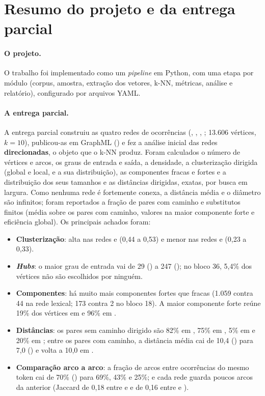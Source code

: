 \section{Resumo do projeto e da entrega parcial}\label{sec:parcial}

\paragraph{O projeto.} O trabalho foi implementado como um \emph{pipeline} em Python, com uma
etapa por módulo (corpus, amostra, extração dos vetores, k-NN, métricas, análise e relatório),
configurado por arquivos YAML.

\paragraph{A entrega parcial.} A entrega parcial construiu as quatro redes de ocorrências
(, , , ; 13.606 vértices, $k=10$), publicou-as em GraphML
() e fez a análise inicial das redes \textbf{direcionadas}, o objeto que o
k-NN produz. Foram calculados o número de vértices e arcos, os graus de entrada e saída, a
densidade, a clusterização dirigida (global e local, e a sua distribuição), as componentes
fracas e fortes e a distribuição dos seus tamanhos e as distâncias dirigidas, exatas, por busca
em largura. Como nenhuma rede é fortemente conexa, a distância média e o diâmetro são
infinitos; foram reportados a fração de pares com caminho e substitutos finitos (média sobre os
pares com caminho, valores na maior componente forte e eficiência global). Os principais
achados foram:
\begin{itemize}
    \item \textbf{Clusterização}: alta nas redes  e  (0,44 a 0,53) e menor
    nas redes  e  (0,23 a 0,33).
    \item \textbf{\emph{Hubs}}: o maior grau de entrada vai de 29 () a 247
    (); no bloco 36, 5,4\% dos vértices não são escolhidos por ninguém.
    \item \textbf{Componentes}: há muito mais componentes fortes que fracas (1.059 contra 44
    na rede lexical; 173 contra 2 no bloco 18). A maior componente forte reúne 19\% dos
    vértices em  e 96\% em .
    \item \textbf{Distâncias}: os pares sem caminho dirigido são 82\% em , 75\% em
    , 5\% em  e 20\% em ; entre os pares com caminho, a distância
    média cai de 10,4 () para 7,0 () e volta a 10,0 em .
    \item \textbf{Comparação arco a arco}: a fração de arcos entre ocorrências do mesmo token
    cai de 70\% () para 69\%, 43\% e 25\%; e cada rede guarda poucos arcos da
    anterior (Jaccard de 0,18 entre  e  e de 0,16 entre  e
    ).
\end{itemize}
